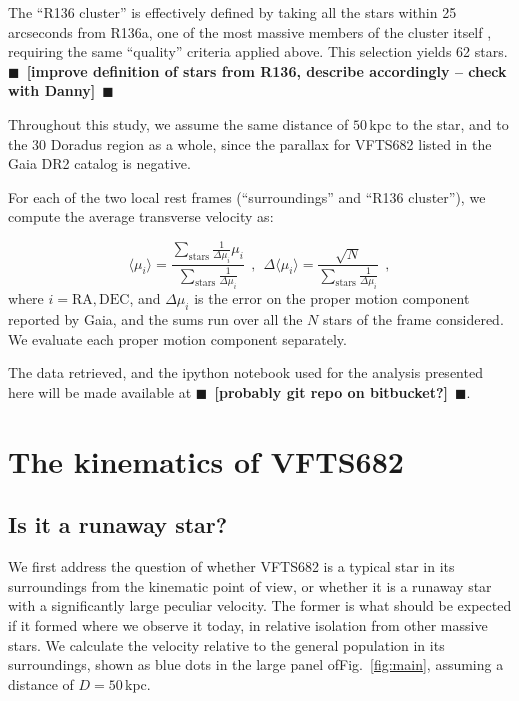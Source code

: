 \documentclass{aa}
\newcommand{\todo}[1]{{\large $\blacksquare$~\textbf{\color{red}[#1]}}~$\blacksquare$}
\DeclareRobustCommand{\Figref}[1]{Fig.~\ref{#1}}
\begin{document}
The ``R136 cluster'' is effectively defined by taking all the stars
within 25 arcseconds from R136a, one of the most massive members of
the cluster itself \citep[][]{crowther:10}, requiring the same
``quality'' criteria applied above. This selection yields 62 stars.
\todo{improve definition
  of stars from R136, describe accordingly -- check with Danny}

Throughout this study, we assume the same distance of $50$\,kpc to the star, and to
the 30 Doradus region as a whole, since the parallax for VFTS682
listed in the Gaia DR2 catalog is negative. %

For each of the two local rest frames (``surroundings'' and ``R136
cluster''), we compute the average transverse velocity as:

\begin{equation}
  \label{eq:mean}
  \langle \mu_i\rangle = \frac{\sum_\mathrm{stars}\frac{1}{\Delta
      \mu_i}\mu_i}{\sum_\mathrm{stars} \frac{1}{\Delta \mu_i}} \ \ , \
  \ \Delta \langle \mu_i\rangle = \frac{\sqrt{N}}{\sum_\mathrm{stars}
    \frac{1}{\Delta \mu_i}} \ \ ,
\end{equation}
where $i = \mathrm{RA}, \mathrm{DEC}$, and $\Delta \mu_i$ is the error
on the proper motion component reported by Gaia, and the sums run over
all the $N$ stars of the frame considered. We evaluate each proper motion
component separately. 

The data retrieved, and the ipython notebook used for the analysis
presented here will be made available at \todo{probably git repo on bitbucket?}. 

\section{The kinematics of VFTS682}
\label{sec:results}

\subsection{Is it a runaway star?}
We first address the question of whether VFTS682 is a typical star in
its surroundings from the kinematic point of view, or whether it is a
runaway star with a significantly large peculiar velocity. The former is what should
be expected if it formed where we observe it today, in relative
isolation from other massive stars. We calculate the velocity relative
to the general population in its surroundings, shown as blue dots in
the large panel of\Figref{fig:main}, assuming a distance of
$D=50$\,kpc.
\end{document}
